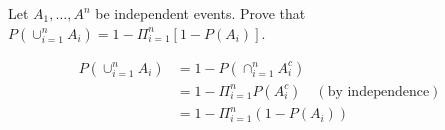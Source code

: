 \begin{exercise}
  Let $A_1,\ldots,A^n$ be independent events. Prove that $P(\cup_{i=1}^nA_i)=1-\Pi_{i=1}^n[1-P(A_i)]$.
\end{exercise}
\begin{solution}
  \begin{align*}
    P(\cup_{i=1}^nA_i) &= 1 - P(\cap_{i=1}^n A_i^c) \\
      &= 1 - \Pi_{i=1}^n P(A_i^c)  \quad(\mbox{by independence}) \\
      &= 1 - \Pi_{i=1}^n (1-P(A_i))
  \end{align*}
\end{solution}
